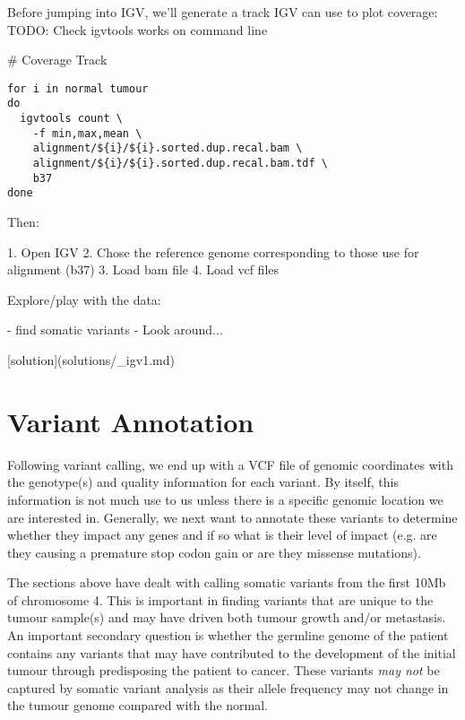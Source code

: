 Before jumping into IGV, we'll generate a track IGV can use to plot coverage:
TODO: Check igvtools works on command line

# Coverage Track
\begin{lstlisting}
for i in normal tumour
do
  igvtools count \
    -f min,max,mean \
    alignment/${i}/${i}.sorted.dup.recal.bam \
    alignment/${i}/${i}.sorted.dup.recal.bam.tdf \
    b37
done
\end{lstlisting}


Then:
 
   1. Open IGV
   2. Chose the reference genome corresponding to those use for alignment (b37)
   3. Load bam file
   4. Load vcf files

Explore/play with the data: 
 
   - find somatic variants
    - Look around...

[solution](solutions/_igv1.md)

\newpage






\section{Variant Annotation}

Following variant calling, we end up with a VCF file of genomic coordinates with the genotype(s) and quality information for each variant. By itself, this information is not much use to us unless there is a specific genomic location we are interested in. Generally, we next want to annotate these variants to determine whether they impact any genes and if so what is their level of impact (e.g. are they causing a premature stop codon gain or are they missense mutations).

The sections above have dealt with calling somatic variants from the first 10Mb of chromosome 4. This is important in finding variants that are unique to the tumour sample(s) and may have driven both tumour growth and/or metastasis. An important secondary question is whether the germline genome of the patient contains any variants that may have contributed to the development of the initial tumour through predisposing the patient to cancer. These variants \textit{may not} be captured by somatic variant analysis as their allele frequency may not change in the tumour genome compared with the normal.

